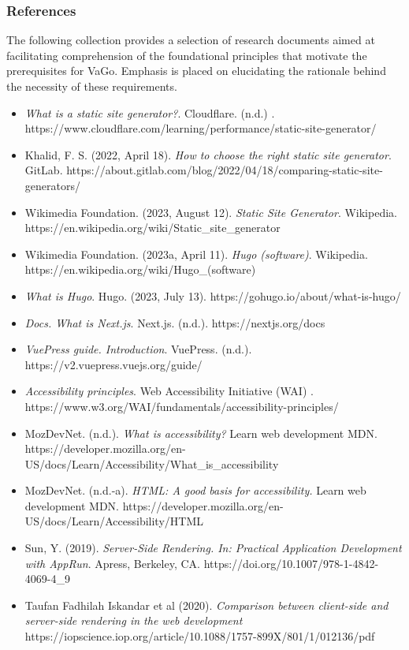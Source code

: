 \subsubsection{References}\label{subsubsec:srs-references}

The following collection provides a selection of research documents
aimed at facilitating comprehension of the foundational principles that
motivate the prerequisites for VaGo. Emphasis is placed on elucidating
the rationale behind the necessity of these requirements.


\begin{itemize}
    \item
    \emph{What is a static site generator?}. Cloudflare. (n.d.) .
    https://www.cloudflare.com/learning/performance/static-site-generator/
    \item
    Khalid, F. S. (2022, April 18). \emph{How to choose the right static
    site generator}. GitLab.
    https://about.gitlab.com/blog/2022/04/18/comparing-static-site-generators/
    \item
    Wikimedia Foundation. (2023, August 12). \emph{Static Site Generator}.
    Wikipedia. https://en.wikipedia.org/wiki/Static\_site\_generator
    \item
    Wikimedia Foundation. (2023a, April 11). \emph{Hugo (software)}.
    Wikipedia. https://en.wikipedia.org/wiki/Hugo\_(software)
    \item
    \emph{What is Hugo}. Hugo. (2023, July 13).
    https://gohugo.io/about/what-is-hugo/
    \item
    \emph{Docs. What is Next.js}. Next.js. (n.d.). https://nextjs.org/docs
    \item
    \emph{VuePress guide. Introduction}. VuePress. (n.d.).
    https://v2.vuepress.vuejs.org/guide/
    \item
    \emph{Accessibility principles}. Web Accessibility Initiative (WAI) .
    https://www.w3.org/WAI/fundamentals/accessibility-principles/
    \item
    MozDevNet. (n.d.). \emph{What is accessibility?} Learn web development
    \textbar{} MDN.
    https://developer.mozilla.org/en-US/docs/Learn/Accessibility/What\_is\_accessibility
    \item
    MozDevNet. (n.d.-a). \emph{HTML: A good basis for accessibility.}
    Learn web development \textbar{} MDN.
    https://developer.mozilla.org/en-US/docs/Learn/Accessibility/HTML
    \item
    Sun, Y. (2019). \emph{Server-Side Rendering. In: Practical Application
    Development with AppRun}. Apress, Berkeley, CA.
    https://doi.org/10.1007/978-1-4842-4069-4\_9
    \item
    Taufan Fadhilah Iskandar et al (2020). \emph{Comparison between
    client-side and server-side rendering in the web development}
    https://iopscience.iop.org/article/10.1088/1757-899X/801/1/012136/pdf
\end{itemize}

